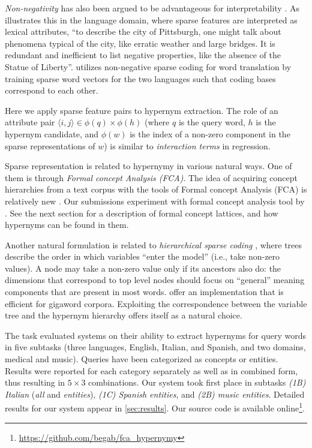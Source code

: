 \documentclass[11pt,a4paper]{article}
\begin{document}
\emph{Non-negativity} has also been argued to be advantageous for 
interpretability
\citep{Faruqui:2015,Fyshe:2015,Arora:2016}. As \citet{Subramanian:2018}
illustrates this in the language domain, where sparse features are interpreted
as lexical attributes, ``to describe the city of Pittsburgh, one might talk
about phenomena typical of the city, like erratic weather and large bridges. It
is redundant and inefficient to list negative properties, like the absence of
the Statue of Liberty''.
\citet{Berend:2018} utilizes non-negative sparse coding for word translation by
training sparse word vectors for the two languages such that coding bases
correspond to each other.

Here we apply sparse feature pairs to hypernym extraction. The role of an
attribute pair $\langle i,j\rangle\in\phi(q)\times\phi(h)$ (where $q$ is the query word,
$h$ is the hypernym candidate, and $\phi(w)$ is the index of a non-zero
component in the sparse representations of $w$) is similar to \emph{interaction
terms} in regression.

Sparse representation is related to hypernymy in various natural ways.  One of
them is through \emph{Formal concept Analysis (FCA)}.  The idea of acquiring 
concept
hierarchies from a text corpus with the tools of Formal concept Analysis (FCA)
is relatively new \citep{Cimiano:2005}.
Our submissions experiment with formal concept analysis tool by
\citet{Endres:2010}. See the next section for a description of formal concept
lattices, and how hypernyms can be found in them.

Another natural formulation is related to \emph{hierarchical sparse coding}
\citep{Zhao:2009}, where trees describe the order in which variables “enter the
model” (i.e., take non-zero values). A node may take a non-zero value only if its
ancestors also do: the dimensions that correspond to top level nodes should
focus on “general” meaning components that are present in most words.
\citet{Yogatama:2015} offer an implementation that is efficient for gigaword
corpora. Exploiting the correspondence between the variable tree and the
hypernym hierarchy offers itself as a natural choice.

The task \citep{Camacho-Collados:2018} evaluated systems on their ability to
extract hypernyms for query words in five subtasks (three languages, English,
Italian, and Spanish, and two domains, medical and music). Queries have been
categorized as concepts or entities. Results were reported for each category 
separately as well as in combined form, thus resulting in $5\times 3$ 
combinations.  
  Our system took first place in subtasks
  \emph{(1B) Italian} (\emph{all} and \emph{entities}),
  \emph{(1C) Spanish entities}, and
  \emph{(2B) music entities}.
Detailed results for our system appear in \autoref{sec:results}.
Our source code is available
online\footnote{\url{https://github.com/begab/fca_hypernymy}}.
\end{document}
